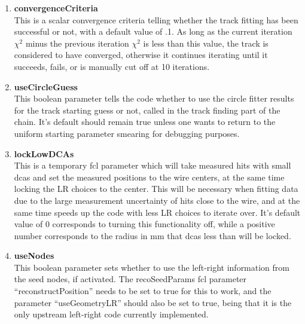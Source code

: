 \begin{enumerate}
      \item{\bf{convergenceCriteria}} \\
      This is a scalar convergence criteria telling whether the track fitting has been successful or not, with a default value of .1. As long as the current iteration $\chi^{2}$ minus the previous iteration $\chi^{2}$ is less than this value, the track is considered to have converged, otherwise it continues iterating until it succeeds, fails, or is manually cut off at 10 iterations.

      \item{\bf{useCircleGuess}} \\
      This boolean parameter tells the code whether to use the circle fitter results for the track starting guess or not, called in the track finding part of the chain. It's default should remain true unless one wants to return to the uniform starting parameter smearing for debugging purposes.

      \item{\bf{lockLowDCAs}} \\
      This is a temporary fcl parameter which will take measured hits with small dcas and set the measured positions to the wire centers, at the same time locking the LR choices to the center. This will be necessary when fitting data due to the large measurement uncertainty of hits close to the wire, and at the same time speeds up the code with less LR choices to iterate over. It's default value of 0 corresponds to turning this functionality off, while a positive number corresponds to the radius in mm that dcas less than will be locked.

      \item{\bf{useNodes}} \\
      This boolean parameter sets whether to use the left-right information from the seed nodes, if activated. The recoSeedParams fcl parameter ``reconstructPosition'' needs to be set to true for this to work, and the parameter ``useGeometryLR'' should also be set to true, being that it is the only upstream left-right code currently implemented.


\end{enumerate}
